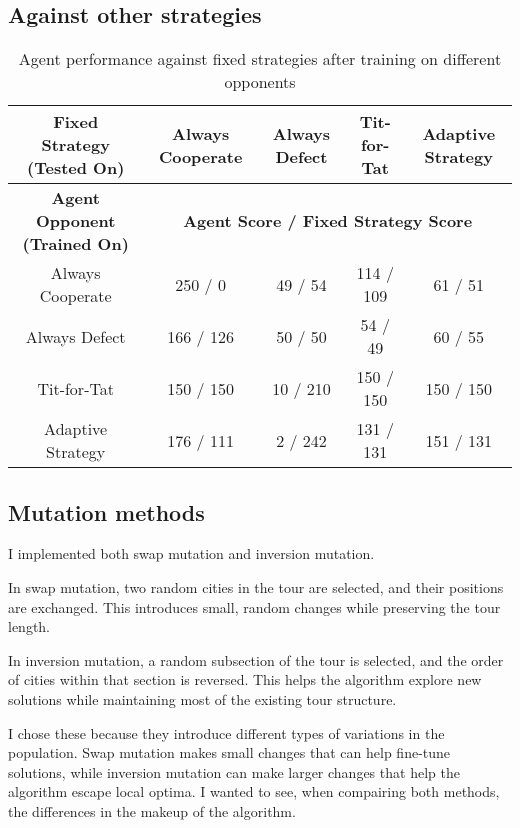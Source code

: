 \documentclass[11pt]{scrartcl} %
\begin{document}
\subsection{Against other strategies}
\begin{table}[h!]
    \centering
    \begin{tabular}{|c|c|c|c|c|}
        \hline
        \textbf{Fixed Strategy (Tested On)} & \textbf{Always Cooperate} & \textbf{Always Defect} & \textbf{Tit-for-Tat} & \textbf{Adaptive Strategy} \\ \hline
        \textbf{Agent Opponent (Trained On)} & \multicolumn{4}{c|}{\textbf{Agent Score / Fixed Strategy Score}} \\ \hline
        Always Cooperate & 250 / 0 & 49 / 54 & 114 / 109 & 61 / 51 \\ \hline
        Always Defect & 166 / 126 & 50 / 50 & 54 / 49 & 60 / 55 \\ \hline
        Tit-for-Tat & 150 / 150 & 10 / 210 & 150 / 150 & 150 / 150 \\ \hline
        Adaptive Strategy & 176 / 111 & 2 / 242 & 131 / 131 & 151 / 131 \\ \hline
    \end{tabular}
    \caption{Agent performance against fixed strategies after training on different opponents}
    \label{tab:agent_vs_fixed_strats}
\end{table}







\subsection{Mutation methods}

I implemented both swap mutation and inversion mutation.

In swap mutation, two random cities in the tour are selected, and their positions are exchanged. This introduces small, random changes while preserving the tour length.

In inversion mutation, a random subsection of the tour is selected, and the order of cities within that section is reversed. This helps the algorithm explore new solutions while maintaining most of the existing tour structure.

I chose these because they introduce different types of variations in the population. Swap mutation makes small changes that can help fine-tune solutions, while inversion mutation can make larger changes that help the algorithm escape local optima. 
I wanted to see, when compairing both methods, the differences in the makeup of the algorithm.
\end{document}
